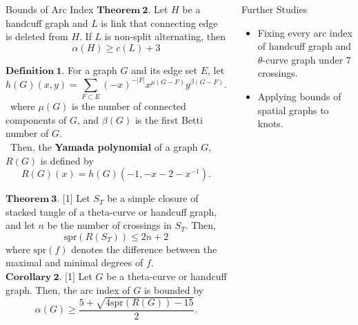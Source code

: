 \documentclass[final]{beamer}
\begin{document}
\begin{frame}[t]
\begin{columns}[t]
\begin{block}{Bounds of Arc Index}
  $\mathbf{Theorem\ 2.}$ Let $H$ be a handcuff graph and $L$ is link that connecting edge is deleted from $H$. If $L$ is non-split alternating, then 
  \begin{equation*}
    \alpha(H) \geq c(L) + 3
  \end{equation*}

    $\mathbf{Definition\ 1.}$ For a graph $G$ and its edge set $E$, let
    \[ h(G)(x, y) = \sum_{F \subset E} (-x)^{-|F|} x^{\mu(G-F)} y^{\beta(G-F)}. \]
    \ where $\mu(G)$ is the number of connected components of $G$, and $\beta(G)$ is the first Betti number of $G$. \\
    \ Then, the \textbf{Yamada polynomial} of a graph $G$, $R(G)$ is defined by
    \[ R(G)(x) = h(G)(-1, -x-2-x^{-1}). \]



    
    $\mathbf{Theorem\ 3.}$ $[$1$]$ Let $S_T$ be a simple closure of stacked tangle of a theta-curve or handcuff graph, and let $n$ be the number of crossings in $S_T$. Then,
     \[ \mathrm{spr}(R(S_T)) \leq 2n+2 \]
     where $\mathrm{spr}(f)$ denotes the difference between the maximal and minimal degrees of $f$. \\


    $\mathbf{Corollary\ 2.}$ $[$1$]$ Let $G$ be a theta-curve or handcuff graph. Then, the arc index of $G$ is bounded by
      \[ \alpha(G) \geq \frac{5 + \sqrt{4 \mathrm{spr}(R(G)) - 15}}{2}. \]
  \end{block}

  \begin{block}{Further Studies}
    \begin{itemize}
      \item Fixing every arc index of handcuff graph and $\theta$-curve graph under $7$ crossings.
      \item Applying bounds of spatial graphs to knots.
    \end{itemize}
  \end{block}


\end{columns}
\end{frame}
\end{document}
